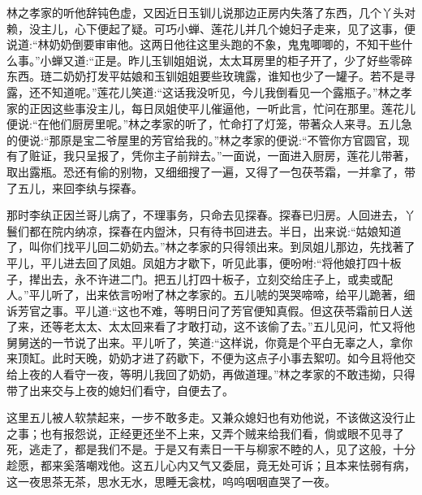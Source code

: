 \begin{parag}
    林之孝家的听他辞钝色虚，又因近日玉钏儿说那边正房内失落了东西，几个丫头对赖，没主儿，心下便起了疑。可巧小蝉、莲花儿并几个媳妇子走来，见了这事，便说道:“林奶奶倒要审审他。这两日他往这里头跑的不象，鬼鬼唧唧的，不知干些什么事。”小蝉又道:“正是。昨儿玉钏姐姐说，太太耳房里的柜子开了，少了好些零碎东西。琏二奶奶打发平姑娘和玉钏姐姐要些玫瑰露，谁知也少了一罐子。若不是寻露，还不知道呢。”莲花儿笑道:“这话我没听见，今儿我倒看见一个露瓶子。”林之孝家的正因这些事没主儿，每日凤姐使平儿催逼他，一听此言，忙问在那里。莲花儿便说:“在他们厨房里呢。”林之孝家的听了，忙命打了灯笼，带著众人来寻。五儿急的便说:“那原是宝二爷屋里的芳官给我的。”林之孝家的便说:“不管你方官圆官，现有了赃证，我只呈报了，凭你主子前辩去。”一面说，一面进入厨房，莲花儿带著，取出露瓶。恐还有偷的别物，又细细搜了一遍，又得了一包茯苓霜，一并拿了，带了五儿，来回李纨与探春。
\end{parag}


\begin{parag}
    那时李纨正因兰哥儿病了，不理事务，只命去见探春。探春已归房。人回进去，丫鬟们都在院内纳凉，探春在内盥沐，只有待书回进去。半日，出来说:“姑娘知道了，叫你们找平儿回二奶奶去。”林之孝家的只得领出来。到凤姐儿那边，先找著了平儿，平儿进去回了凤姐。凤姐方才歇下，听见此事，便吩咐:“将他娘打四十板子，撵出去，永不许进二门。把五儿打四十板子，立刻交给庄子上，或卖或配人。”平儿听了，出来依言吩咐了林之孝家的。五儿唬的哭哭啼啼，给平儿跪著，细诉芳官之事。平儿道:“这也不难，等明日问了芳官便知真假。但这茯苓霜前日人送了来，还等老太太、太太回来看了才敢打动，这不该偷了去。”五儿见问，忙又将他舅舅送的一节说了出来。平儿听了，笑道:“这样说，你竟是个平白无辜之人，拿你来顶缸。此时天晚，奶奶才进了药歇下，不便为这点子小事去絮叨。如今且将他交给上夜的人看守一夜，等明儿我回了奶奶，再做道理。”林之孝家的不敢违拗，只得带了出来交与上夜的媳妇们看守，自便去了。
\end{parag}


\begin{parag}
    这里五儿被人软禁起来，一步不敢多走。又兼众媳妇也有劝他说，不该做这没行止之事；也有报怨说，正经更还坐不上来，又弄个贼来给我们看，倘或眼不见寻了死，逃走了，都是我们不是。于是又有素日一干与柳家不睦的人，见了这般，十分趁愿，都来奚落嘲戏他。这五儿心内又气又委屈，竟无处可诉；且本来怯弱有病，这一夜思茶无茶，思水无水，思睡无衾枕，呜呜咽咽直哭了一夜。
\end{parag}


